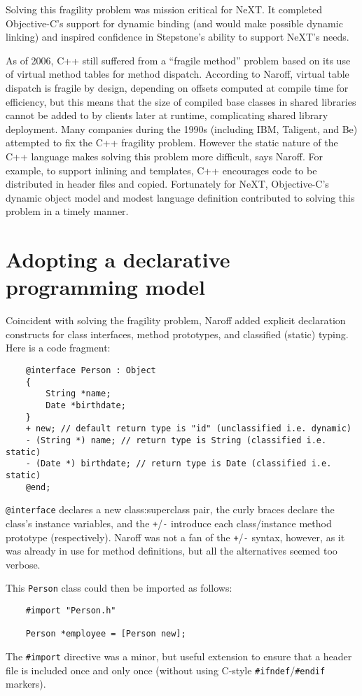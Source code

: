 \documentclass[acmsmall]{acmart}\settopmatter{}
\begin{document}
Solving this fragility problem was mission critical for NeXT. It completed Objective-C's support for dynamic binding (and would make possible dynamic linking) and inspired confidence in Stepstone's ability to support NeXT's needs.

As of 2006, C++ still suffered from a ``fragile method'' problem based on its use of virtual method tables for method dispatch. According to Naroff, virtual table dispatch is fragile by design, depending on offsets computed at compile time for efficiency, but this means that the size of compiled base classes in shared libraries cannot be added to by clients later at runtime, complicating shared library deployment. Many companies during the 1990s (including IBM, Taligent, and Be) attempted to fix the C++ fragility problem. However the static nature of the C++ language makes solving this problem more difficult, says Naroff. For example, to support inlining and templates, C++ encourages code to be distributed in header files and copied. Fortunately for NeXT, Objective-C's dynamic object model and modest language definition contributed to solving this problem in a timely manner. 
\section{Adopting a declarative programming model}
\label{sec-declarative}
Coincident with solving the fragility problem, Naroff added explicit declaration constructs for class interfaces, method prototypes, and classified (static) typing. Here is a code fragment:
\begin{verbatim}
    @interface Person : Object
    {
        String *name;
        Date *birthdate;
    }
    + new; // default return type is "id" (unclassified i.e. dynamic)
    - (String *) name; // return type is String (classified i.e. static)
    - (Date *) birthdate; // return type is Date (classified i.e. static)
    @end;
\end{verbatim}
\verb$@interface$ declares a new class:superclass pair, the curly braces declare the class's instance variables, and the \verb$+$/\verb$-$ introduce each class/instance method prototype (respectively). Naroff was not a fan of the \verb$+$/\verb$-$ syntax, however, as it was already in use for method definitions, but all the alternatives seemed too verbose.

This \verb$Person$ class could then be imported as follows:
\begin{verbatim}
    #import "Person.h"
    
    Person *employee = [Person new];
\end{verbatim}
The \verb$#import$ directive was a minor, but useful extension to ensure that a header file is included once and only once (without using C-style \verb$#ifndef$/\verb$#endif$ markers). 
\end{document}
